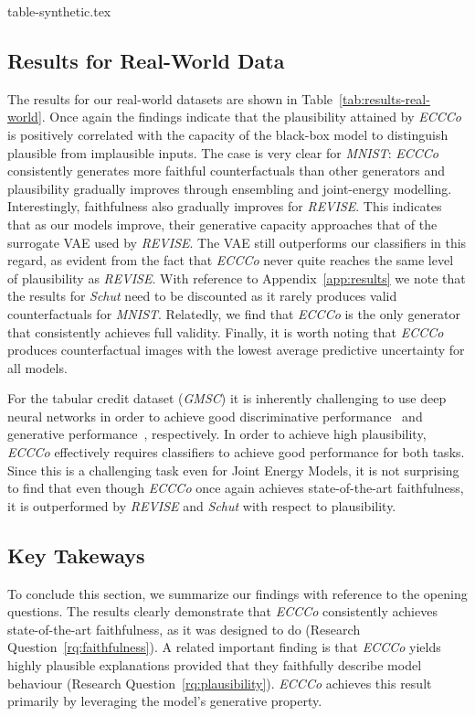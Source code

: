 {table-synthetic.tex}

\subsection{Results for Real-World Data}

The results for our real-world datasets are shown in Table~\ref{tab:results-real-world}. Once again the findings indicate that the plausibility attained by \textit{ECCCo} is positively correlated with the capacity of the black-box model to distinguish plausible from implausible inputs. The case is very clear for \textit{MNIST}: \textit{ECCCo} consistently generates more faithful counterfactuals than other generators and plausibility gradually improves through ensembling and joint-energy modelling. Interestingly, faithfulness also gradually improves for \textit{REVISE}. This indicates that as our models improve, their generative capacity approaches that of the surrogate VAE used by \textit{REVISE}. The VAE still outperforms our classifiers in this regard, as evident from the fact that \textit{ECCCo} never quite reaches the same level of plausibility as \textit{REVISE}. With reference to Appendix~\ref{app:results} we note that the results for \textit{Schut} need to be discounted as it rarely produces valid counterfactuals for \textit{MNIST}. Relatedly, we find that \textit{ECCCo} is the only generator that consistently achieves full validity. Finally, it is worth noting that \textit{ECCCo} produces counterfactual images with the lowest average predictive uncertainty for all models. 

For the tabular credit dataset (\textit{GMSC}) it is inherently challenging to use deep neural networks in order to achieve good discriminative performance~\citep{borisov2022deep,grinsztajn2022why} and generative performance~\citep{liu2022goggle}, respectively. In order to achieve high plausibility, \textit{ECCCo} effectively requires classifiers to achieve good performance for both tasks. Since this is a challenging task even for Joint Energy Models, it is not surprising to find that even though \textit{ECCCo} once again achieves state-of-the-art faithfulness, it is outperformed by \textit{REVISE} and \textit{Schut} with respect to plausibility.

\subsection{Key Takeways}

To conclude this section, we summarize our findings with reference to the opening questions. The results clearly demonstrate that \textit{ECCCo} consistently achieves state-of-the-art faithfulness, as it was designed to do (Research Question~\ref{rq:faithfulness}). A related important finding is that \textit{ECCCo} yields highly plausible explanations provided that they faithfully describe model behaviour (Research Question~\ref{rq:plausibility}). \textit{ECCCo} achieves this result primarily by leveraging the model's generative property.

